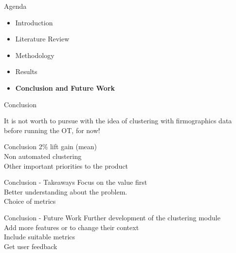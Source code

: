 \begin{frame}{Agenda}
\begin{itemize}
    \item Introduction
    \item Literature Review
    \item Methodology
    \item Results
    \item \textbf{Conclusion and Future Work}
\end{itemize}
\end{frame}


\begin{frame}{Conclusion} \pause
    \begin{center}
        \huge{It is not worth to pursue with the idea of clustering with firmographics data before running the OT\pause , for now!}
    \end{center}
\end{frame}


\begin{frame}{Conclusion}
    2\% lift gain (mean) \\
    \vspace{0.5cm}
    Non automated clustering \\
    \vspace{0.5cm}
    Other important priorities to the product
\end{frame}


\begin{frame}{Conclusion - Takeaways} \pause
    Focus on the value first \\ \pause
    \vspace{0.5cm}
    Better understanding about the problem. \\ \pause
    \vspace{0.5cm}
    Choice of metrics
\end{frame}


\begin{frame}{Conclusion - Future Work} \pause
    Further development of the clustering module \\ \pause
    \vspace{0.5cm}
    Add more features or to change their context \\ \pause
    \vspace{0.5cm}
    Include suitable metrics \\ \pause
    \vspace{0.5cm}
    Get user feedback
\end{frame}